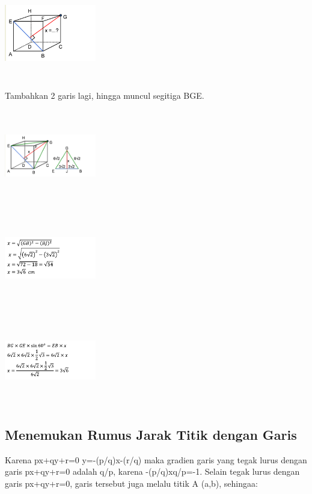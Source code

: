\documentclass[11pt,fleqn]{book} %
\begin{document}
\includegraphics[width = 4cm, height= 4cm]{Pictures/gi25.png}

Tambahkan 2 garis lagi, hingga muncul segitiga BGE. 

\includegraphics[width = 4cm, height= 4cm]{Pictures/gi26.png}

\includegraphics[width = 4cm, height= 4cm]{Pictures/gi27.png}

\includegraphics[width = 4cm, height= 4cm]{Pictures/gi28.png}

\subsection{Menemukan Rumus Jarak Titik dengan Garis}

Karena px+qy+r=0 y=-(p/q)x-(r/q) maka gradien garis yang tegak lurus dengan garis px+qy+r=0 adalah q/p, karena -(p/q)xq/p=-1. Selain tegak lurus dengan garis px+qy+r=0, garis tersebut juga melalu titik A (a,b), sehingaa:
\end{document}
